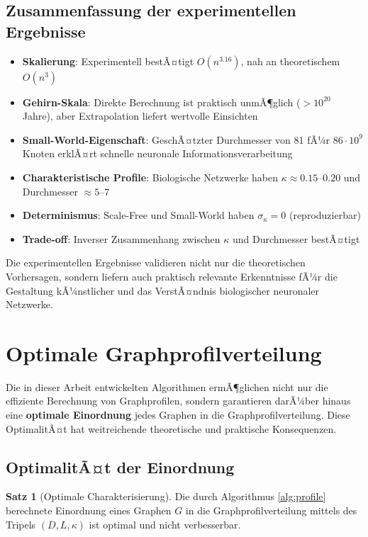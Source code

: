 ﻿\documentclass[a4paper,12pt]{article}
\theoremstyle{definition}
\newtheorem{satz}{Satz}
\begin{document}
	\subsection{Zusammenfassung der experimentellen Ergebnisse}
	
	\begin{itemize}
		\item[-] \textbf{Skalierung}: Experimentell bestÃ¤tigt $O(n^{3.16})$, nah an theoretischem $O(n^3)$
		\item[-] \textbf{Gehirn-Skala}: Direkte Berechnung ist praktisch unmÃ¶glich ($>10^{20}$ Jahre), aber Extrapolation liefert wertvolle Einsichten
		\item[-] \textbf{Small-World-Eigenschaft}: GeschÃ¤tzter Durchmesser von 81 fÃ¼r $86 \cdot 10^9$ Knoten erklÃ¤rt schnelle neuronale Informationsverarbeitung
		\item[-] \textbf{Charakteristische Profile}: Biologische Netzwerke haben $\kappa \approx 0.15\text{--}0.20$ und Durchmesser $\approx 5\text{--}7$
		\item[-] \textbf{Determinismus}: Scale-Free und Small-World haben $\sigma_\kappa = 0$ (reproduzierbar)
		\item[-] \textbf{Trade-off}: Inverser Zusammenhang zwischen $\kappa$ und Durchmesser bestÃ¤tigt
	\end{itemize}
	
	Die experimentellen Ergebnisse validieren nicht nur die theoretischen Vorhersagen, sondern liefern auch praktisch relevante Erkenntnisse fÃ¼r die Gestaltung kÃ¼nstlicher und das VerstÃ¤ndnis biologischer neuronaler Netzwerke.
	
	\section{Optimale Graphprofilverteilung}
	
	Die in dieser Arbeit entwickelten Algorithmen ermÃ¶glichen nicht nur die effiziente Berechnung von Graphprofilen, sondern garantieren darÃ¼ber hinaus eine \textbf{optimale Einordnung} jedes Graphen in die Graphprofilverteilung. Diese OptimalitÃ¤t hat weitreichende theoretische und praktische Konsequenzen.
	
	\subsection{OptimalitÃ¤t der Einordnung}
	
	\begin{satz}[Optimale Charakterisierung]
		Die durch Algorithmus \ref{alg:profile} berechnete Einordnung eines Graphen $G$ in die Graphprofilverteilung mittels des Tripels $(D, L, \kappa)$ ist optimal und nicht verbesserbar.
	\end{satz}
	
\end{document}
